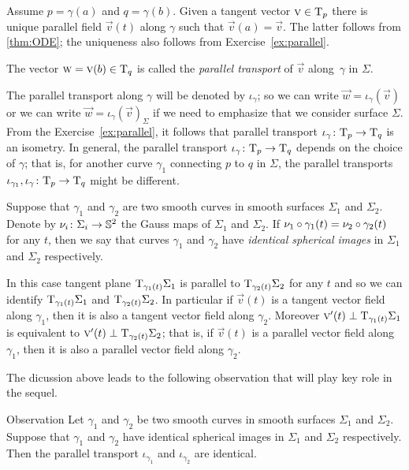 Assume $p=\gamma(a)$ and $q=\gamma(b)$.
Given a tangent vector ${\textsc v}\in\mathrm{T}_p$ there is unique parallel field ${\vec v}(t)$ along $\gamma$ such that ${\vec v}(a)={\vec v}$.
The latter follows from \ref{thm:ODE}; the uniqueness also follows from Exercise~\ref{ex:parallel}.

The vector $\textsc w={\textsc v}(b)\in\mathrm{T}_q$ is called the \emph{parallel transport} of ${\vec v}$ along~$\gamma$ in $\Sigma$.

The parallel transport along $\gamma$ will be denoted by $\iota_\gamma$;
so we can write $\vec w=\iota_\gamma({\vec v})$ or we can write $\vec w=\iota_\gamma({\vec v})_\Sigma$ if we need to emphasize that we consider surface $\Sigma$.
From the Exercise~\ref{ex:parallel}, it follows that parallel transport $\iota_\gamma\:\T_p\z\to\T_q$ is an isometry.
In general, the parallel transport $\iota_\gamma\:\T_p\z\to\T_q$ depends on the choice of $\gamma$; that is, for another curve $\gamma_1$ connecting $p$ to $q$ in $\Sigma$, the parallel transports $\iota_{\gamma_1},\iota_{\gamma}\colon\mathrm{T}_p\to\mathrm{T}_q$ might be different.

Suppose that $\gamma_1$ and $\gamma_2$ are two smooth curves in smooth surfaces $\Sigma_1$ and $\Sigma_2$.
Denote by $\nu_i\colon\Sigma_i\to\mathbb{S}^2$ the Gauss maps of $\Sigma_1$ and $\Sigma_2$.
If $\nu_1\circ\gamma_1(t)= \nu_2\circ\gamma_2(t)$ for any $t$, then we say that curves $\gamma_1$ and $\gamma_2$ have {}\emph{identical spherical images} in $\Sigma_1$ and $\Sigma_2$ respectively.

In this case tangent plane $\mathrm{T}_{\gamma_1(t)}\Sigma_1$ is parallel to $\mathrm{T}_{\gamma_2(t)}\Sigma_2$ for any $t$ and so we can identify $\mathrm{T}_{\gamma_1(t)}\Sigma_1$ and $\mathrm{T}_{\gamma_2(t)}\Sigma_2$.
In particular if $\vec v(t)$ is a tangent vector field along $\gamma_1$,
then it is also a tangent vector field along $\gamma_2$.
Moreover $\textsc v'(t)\perp \mathrm{T}_{\gamma_1(t)}\Sigma_1$ is equivalent to $\textsc v'(t)\perp \mathrm{T}_{\gamma_2(t)}\Sigma_2$; that is, if $\vec v(t)$ is a parallel vector field along $\gamma_1$,
then it is also a parallel vector field along $\gamma_2$.

The dicussion above leads to the following observation that will play key role in the sequel.

\begin{thm}{Observation}\label{obs:parallel=}
Let $\gamma_1$ and $\gamma_2$ be two smooth curves in smooth surfaces $\Sigma_1$ and $\Sigma_2$.
Suppose that $\gamma_1$ and $\gamma_2$ have identical spherical images in $\Sigma_1$ and $\Sigma_2$ respectively.
Then the parallel transport $\iota_{\gamma_1}$ and $\iota_{\gamma_2}$ are identical. 
\end{thm}

